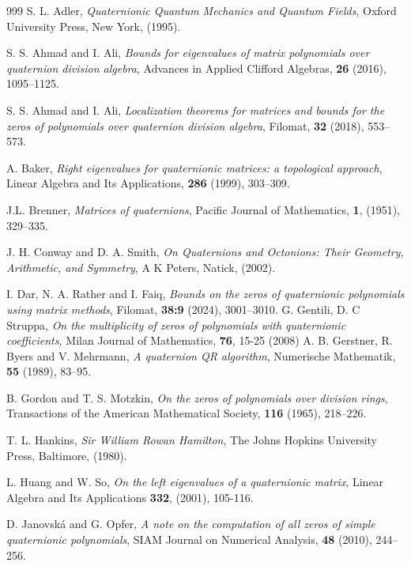 \documentclass [12pt]{article}
\begin{document}
\begin{thebibliography}{999}
S. L. Adler, \textit{Quaternionic Quantum Mechanics and Quantum Fields}, Oxford University Press, New York, (1995).

S. S. Ahmad and I. Ali, \textit{ Bounds for eigenvalues of matrix polynomials over quaternion division algebra}, Advances in Applied Clifford Algebras, \textbf{26} (2016), 1095--1125.
 
 S. S. Ahmad and I. Ali, \textit{Localization theorems for matrices and bounds for the zeros of polynomials over quaternion division algebra}, Filomat, \textbf{32} (2018), 553--573.

A. Baker, \textit{Right eigenvalues for quaternionic matrices: a topological approach}, Linear Algebra and Its Applications, \textbf{286} (1999), 303--309.

  J.L. Brenner, \textit{Matrices of quaternions}, Pacific Journal of Mathematics, \textbf{1}, (1951), 329–335.
 
  J. H. Conway and D. A. Smith, \textit{On Quaternions and Octonions: Their Geometry, Arithmetic, and Symmetry}, A K Peters, Natick, (2002).

 I. Dar, N. A. Rather and I. Faiq,\textit{ Bounds on the zeros of quaternionic polynomials using matrix methods}, Filomat, \textbf{38:9} (2024),  3001--3010.
 G. Gentili, D. C Struppa, \textit{On the multiplicity of zeros of polynomials with quaternionic coefficients,} Milan Journal of Mathematics, \textbf{76}, 15-25 (2008)
A. B. Gerstner, R. Byers and V. Mehrmann, \textit{A quaternion QR algorithm}, Numerische Mathematik, \textbf{55} (1989), 83--95.

 B. Gordon and T. S. Motzkin, \textit{On the zeros of polynomials over division rings}, Transactions of the American Mathematical Society, \textbf{116} (1965), 218--226.

 T. L. Hankins, \textit{Sir William Rowan Hamilton}, The Johns Hopkins University Press, Baltimore, (1980).

L. Huang and W. So, \textit{On the left eigenvalues of a quaternionic matrix}, Linear Algebra and Its Applications \textbf{332}, (2001), 105-116.

 D. Janovsk\'{a} and G. Opfer, \textit{A note on the computation of all zeros of simple quaternionic polynomials}, SIAM Journal on Numerical Analysis, \textbf{48} (2010), 244--256.


\end{thebibliography}
\end{document}
